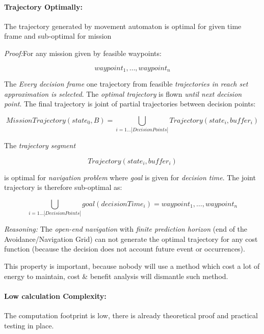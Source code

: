 \paragraph{Trajectory Optimally:}  The trajectory generated by movement automaton is optimal for given time frame and sub-optimal for mission

\emph{Proof:}For any mission given by feasible waypoints:

\begin{equation*}
    waypoint_1, \dots, waypoint_n
\end{equation*}

The \emph{Every decision frame} one trajectory from feasible \emph{trajectories in reach set approximation is selected}. The \emph{optimal trajectory} is flown \emph{until next decision point}. The final trajectory is joint of partial trajectories between decision points:

\begin{equation*}
    Mission Trajectory(state_0,B) = \bigcup_{i=1\dots|Decision Points|} Trajectory(state_i,buffer_i) 
\end{equation*}

The \emph{trajectory segment}

\begin{equation*}
    Trajectory(state_i,buffer_i) 
\end{equation*}

is optimal  for \emph{navigation problem} where \emph{goal} is given for \emph{decision time}. The joint trajectory is therefore sub-optimal as: 

\begin{equation*}
    \bigcup_{i=1\dots|Decision Points|}goal(decision Time _i)  = waypoint_1, \dots, waypoint_n
\end{equation*}

\noindent \emph{Reasoning:} The \emph{open-end navigation} with \emph{finite prediction horizon} (end of the Avoidance/Navigation Grid) can not generate the optimal trajectory for any cost function (because the decision does not account future event or occurrences). 

This property is important, because nobody will use a method which cost a lot of energy to maintain, cost \& benefit analysis will dismantle such method.

\paragraph{Low calculation Complexity:} The computation footprint is low, there is already theoretical proof and practical testing in place.

